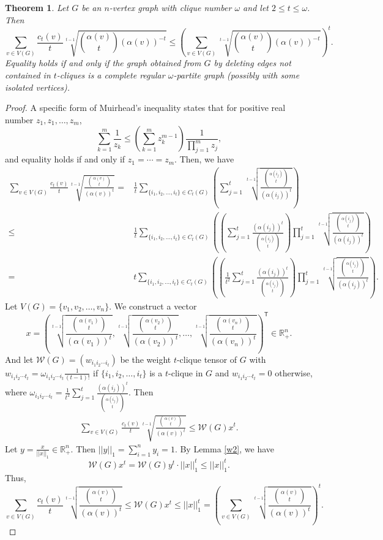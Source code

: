 \documentclass[10pt,a4paper]{amsart}
\newtheorem{thm}{Theorem}
\begin{document}
\begin{thm}\label{le}
Let $G$ be an $n$-vertex graph with clique number $\omega$ and let $2\le t\le\omega$. Then
$$\sum_{v\in V(G)}\frac{c_t(v)}{t}\sqrt[t-1]{\binom{\alpha(v)}{t}\left(\alpha(v)\right)^{-t}} \le \left( \sum_{v\in V(G)}\sqrt[t-1]{\binom{\alpha(v)}{t}\left(\alpha(v)\right)^{-t}} \right)^{t}.$$
Equality holds if and only if the graph obtained from $G$ by deleting edges not contained in $t$-cliques is a complete regular $\omega$-partite graph (possibly with some isolated vertices).
\end{thm}

\begin{proof}
A specific form of Muirhead's inequality states that for positive real number $z_1,z_1,\ldots,z_m$,
$$\sum_{k=1}^{m}\frac{1}{z_k}\le\left(\sum_{k=1}^{m}z_k^{m-1}\right)\frac{1}{\prod_{j=1}^{m}z_j},$$ and equality holds if and only if $z_1=\cdots=z_m$.
Then, we have
\begin{align*}
	 \sum_{v\in V(G)}\frac{c_t(v)}{t}\sqrt[t-1]{\frac{\binom{\alpha(v)}{t}}{\left(\alpha(v)\right)^t}}
= & \frac{1}{t} \sum_{\{i_1,i_2,\ldots,i_t\}\in C_t(G)}\left( \sum_{j=1}^{t} \sqrt[t-1]{\frac{\binom{\alpha(i_j)}{t}}{\left(\alpha(i_j)\right)^t}} \right)\\
\le & \frac{1}{t} \sum_{\{i_1,i_2,\ldots,i_t\}\in C_t(G)} \left( \left( \sum_{j=1}^{t} \frac{\left(\alpha(i_j)\right)^t}{\binom{\alpha(i_j)}{t}} \right) \prod_{j=1}^{t}\sqrt[t-1]{\frac{\binom{\alpha(i_j)}{t}}{\left(\alpha(i_j)\right)^t}} \right)\\
= & t \sum_{\{i_1,i_2,\ldots,i_t\}\in C_t(G)} \left( \left( \frac{1}{t^2} \sum_{j=1}^{t} \frac{\left(\alpha(i_j)\right)^t}{\binom{\alpha(i_j)}{t}} \right) \prod_{j=1}^{t}\sqrt[t-1]{\frac{\binom{\alpha(i_j)}{t}}{\left(\alpha(i_j)\right)^t}} \right).
\end{align*}
Let $V(G)=\{v_1,v_2,\ldots,v_n\}$. We construct a vector
$$x=\left( \sqrt[t-1]{\frac{\binom{\alpha(v_1)}{t}}{\left(\alpha(v_1)\right)^t}}, \sqrt[t-1]{\frac{\binom{\alpha(v_2)}{t}}{\left(\alpha(v_2)\right)^t}}, \ldots, \sqrt[t-1]{\frac{\binom{\alpha(v_n)}{t}}{\left(\alpha(v_n)\right)^t}} \right)^{\mathsf{T}}\in\mathbb{R}^{n}_{+}.$$
And let $\mathcal{W}(G)=(w_{i_1i_2\cdots i_t})$ be the weight $t$-clique tensor of $G$ with $w_{i_1i_2\cdots t_t}=\omega_{i_1i_2\cdots i_t}\frac{1}{(t-1)!}$ if $\{i_1,i_2,\ldots,i_t\}$ is a $t$-clique in $G$ and $w_{i_1i_2\cdots t_t}=0$ otherwise, where $\omega_{i_1i_2\cdots i_t}=\frac{1}{t^2} \sum_{j=1}^{t} \frac{\left(\alpha(i_j)\right)^t}{\binom{\alpha(i_j)}{t}}$.
Then
\begin{align*}
	\sum_{v\in V(G)}\frac{c_t(v)}{t}\sqrt[t-1]{\frac{\binom{\alpha(v)}{t}}{\left(\alpha(v)\right)^t}}\le \mathcal{W}(G)x^{t}.
\end{align*}
Let $y=\frac{x}{||x||_{1}}\in\mathbb{R}^{n}_{+}$. Then $||y||_{1}=\sum_{i=1}^{n}y_i=1$. By Lemma \ref{w2}, we have
$$\mathcal{W}(G)x^t=\mathcal{W}(G)y^t \cdot ||x||_{1}^{t}\le ||x||_{1}^{t}.$$
Thus,
$$	\sum_{v\in V(G)}\frac{c_t(v)}{t}\sqrt[t-1]{\frac{\binom{\alpha(v)}{t}}{\left(\alpha(v)\right)^t}} \le \mathcal{W}(G)x^{t} \le ||x||_{1}^{t} = \left( \sum_{v\in V(G)}\sqrt[t-1]{\frac{\binom{\alpha(v)}{t}}{\left(\alpha(v)\right)^t}} \right)^{t}.$$


\end{proof}
\end{document}
